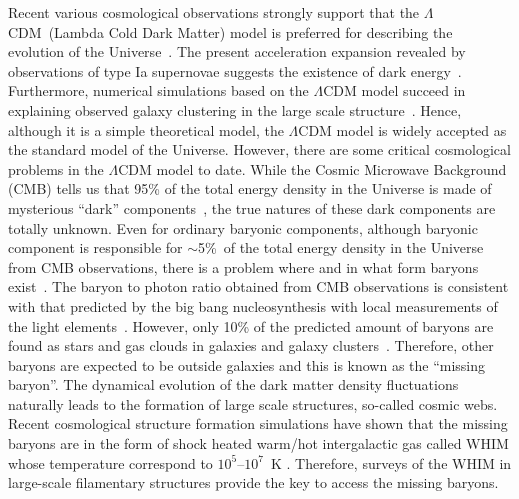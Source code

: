 \documentclass[a4paper,fleqn,usenatbib,useAMS]{mnras}
\begin{document}
Recent various cosmological observations strongly support that
the $\Lambda$CDM~(Lambda Cold Dark Matter) model is preferred for
describing the evolution of the
Universe~\citep{2016A&A...594A..13P}. 
The present acceleration expansion revealed by observations of type Ia supernovae suggests the existence of dark energy~\citep{1997AAS...191.8504P,1998AJ....116.1009R}. 
Furthermore, numerical simulations based on the $\Lambda$CDM model succeed in explaining observed galaxy clustering in the large scale structure~\citep{2016arXiv160703155A}.
Hence, although it is a simple theoretical model,
the $\Lambda$CDM model is widely accepted as the standard model of
the Universe.
However, there are some critical cosmological problems in the
$\Lambda$CDM model to date.
While the Cosmic Microwave Background (CMB) tells us that 95\% of the total
energy density in the Universe is made of mysterious ``dark'' components~\citep{2016A&A...594A..13P},
the true natures of these dark components are totally unknown.
Even for ordinary baryonic components, although
baryonic component is responsible for $\sim$5\%~of the total energy density
in the Universe from CMB observations,
there is a problem where and in what form baryons exist~\citep{1998ApJ...503..518F}.
The baryon to photon ratio obtained from CMB observations is consistent with that 
predicted by the big bang nucleosynthesis with local measurements of the light elements~\citep{2013arXiv1307.6955C}.
However, only 10\% of the predicted amount of baryons are found as stars and gas clouds 
in galaxies and galaxy clusters~\citep{1999MNRAS.309..923S,2004ApJ...616..643F}.
Therefore, other baryons are expected to be outside galaxies and this is known as the ``missing baryon''. 
The dynamical evolution of the dark matter density fluctuations naturally leads to the formation of large scale structures, so-called cosmic webs. 
Recent cosmological structure formation simulations have shown that the missing
baryons are in the form of shock heated warm/hot intergalactic gas
called WHIM whose temperature correspond to $10^5$--$10^7$~K \citep[e.g.][]{Cen1999, Dave2001, Yoshikawa2003, Bregman2007}.
Therefore, surveys of the WHIM in large-scale filamentary structures provide the key to access the missing baryons.
\end{document}
